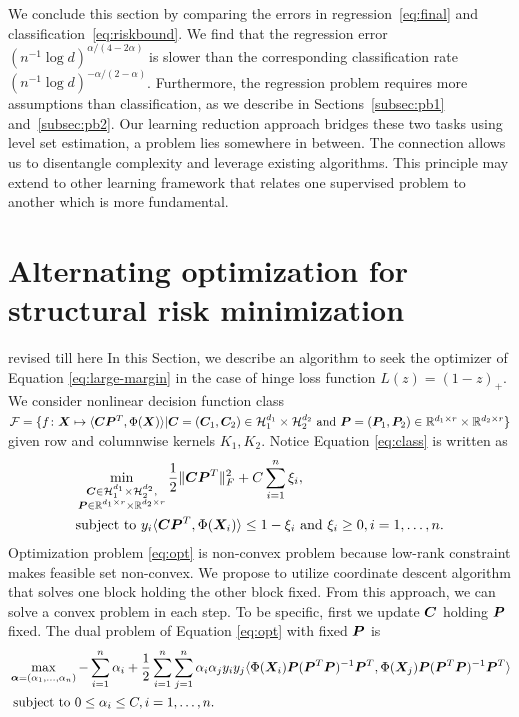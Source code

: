 \documentclass[12pt]{article}
\begin{document}
We conclude this section by comparing the errors in regression~\eqref{eq:final} and classification~\eqref{eq:riskbound}. We find that the regression error $(n^{-1}\log d)^{\alpha/(4-2\alpha)}$ is slower than the corresponding classification rate $(n^{-1}\log d)^{-\alpha/(2-\alpha)}$. Furthermore, the regression problem requires more assumptions than classification, as we describe in Sections~\ref{subsec:pb1} and~\ref{subsec:pb2}. Our learning reduction approach bridges these two tasks using level set estimation, a problem lies somewhere in between. The connection allows us to disentangle complexity and leverage existing algorithms. This principle may extend to other learning framework that relates one supervised problem to another which is more fundamental.  

\section{Alternating optimization for structural risk minimization}\label{sec:alg}
{\color{red} revised till here} In this Section, we describe an algorithm to seek the optimizer of Equation \eqref{eq:large-margin} in the case of hinge loss function $L(z) = (1-z)_+$. We consider nonlinear decision function class $\mathcal{F} = \{f\colon\bm X\mapsto\langle\bm C \bm{P}^T,\Phi(\bm X)\rangle|\bm C = (\bm C_1,\bm C_2)\in\mathcal{H}_1^{d_1}\times \mathcal{H}_2^{d_2} \text{ and }\bm{P} = (\bm{P}_1,\bm{P}_2)\in\mathbb{R}^{d_1\times r} \times \mathbb{R}^{d_2\times r}\}$ given row and columnwise kernels $K_1,K_2$.
Notice Equation \eqref{eq:class} is written as 
\begin{align}
    \label{eq:opt}
    &\min_{\substack{\bm C\in\mathcal{H}_1^{d_1}\times \mathcal{H}_2^{d_2} ,\\\bm{P}\in\mathbb{R}^{d_1\times r} \times \mathbb{R}^{d_2\times r}}}\frac{1}{2}\lVert\bm C\bm{P}^T\rVert_F^2+ C\sum_{i=1}^n \xi_i,\\
    &\text{subject to } y_i\langle\bm C\bm{P}^T,\Phi(\bm X_i)\rangle\leq 1-\xi_i\text{ and } \xi_i\geq 0, i=1,\ldots,n.
\end{align}
Optimization problem \eqref{eq:opt} is non-convex problem because low-rank constraint makes feasible set non-convex.
We propose to utilize coordinate descent algorithm that solves one block holding the other block fixed. From this approach, we can solve a convex problem in each step.
To be specific, first we update $\bm C$ holding $\bm{P}$ fixed.
The dual problem of Equation \eqref{eq:opt} with fixed $\bm{P}$ is 
\begin{align}
    \label{eq:dual1}
    &\max_{\bm\alpha = (\alpha_1,\ldots,\alpha_n)}-\sum_{i=1}^n\alpha_i + \frac{1}{2}\sum_{i=1}^n\sum_{j=1}^n \alpha_i\alpha_j y_iy_j \langle \Phi(\bm X_i)\bm{P}(\bm{P}^T\bm{P})^{-1}\bm{P}^T,\Phi(\bm X_j)\bm{P}(\bm{P}^T\bm{P})^{-1}\bm{P}^T\rangle\\
    &\text{ subject to }  0\leq \alpha_i\leq C, i=1,\ldots,n.
\end{align}
\end{document}
